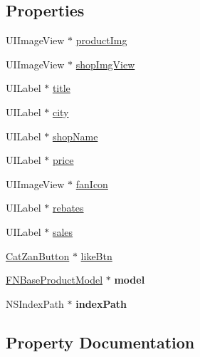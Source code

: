 \subsection*{Properties}
\begin{DoxyCompactItemize}
\item 
U\+I\+Image\+View $\ast$ \mbox{\hyperlink{interface_product_cell_a189ef7a37052dfa1d20b7de5b3c1ef3e}{product\+Img}}
\item 
U\+I\+Image\+View $\ast$ \mbox{\hyperlink{interface_product_cell_a7242ca0f947c47837d8576cdc01fce24}{shop\+Img\+View}}
\item 
U\+I\+Label $\ast$ \mbox{\hyperlink{interface_product_cell_aaff5a1ff89e3c40caf0c2fc336a2fa9a}{title}}
\item 
U\+I\+Label $\ast$ \mbox{\hyperlink{interface_product_cell_a9821fb46904dec3777bd69d106338c48}{city}}
\item 
U\+I\+Label $\ast$ \mbox{\hyperlink{interface_product_cell_a829f21fdd1d59758ae2285c13f5f0f9c}{shop\+Name}}
\item 
U\+I\+Label $\ast$ \mbox{\hyperlink{interface_product_cell_a97f1175a3746c46038e591acc01e43cf}{price}}
\item 
U\+I\+Image\+View $\ast$ \mbox{\hyperlink{interface_product_cell_af03ee8d55febe043dfe8c19d6e80cf51}{fan\+Icon}}
\item 
U\+I\+Label $\ast$ \mbox{\hyperlink{interface_product_cell_a88cc693f9131621461e1aeb4ba9d1b25}{rebates}}
\item 
U\+I\+Label $\ast$ \mbox{\hyperlink{interface_product_cell_a289fadb292e36fa6ea97ec4887435be9}{sales}}
\item 
\mbox{\hyperlink{interface_cat_zan_button}{Cat\+Zan\+Button}} $\ast$ \mbox{\hyperlink{interface_product_cell_a4a15ac98da9d5a229114a546fd2347da}{like\+Btn}}
\item 
\mbox{\label{interface_product_cell_a6767ffd3bf86f807fc0d3a2888d75331}} 
\mbox{\hyperlink{interface_f_n_base_product_model}{F\+N\+Base\+Product\+Model}} $\ast$ {\bfseries model}
\item 
\mbox{\label{interface_product_cell_a26a8bef958d007965d4e6b9973d4a31c}} 
N\+S\+Index\+Path $\ast$ {\bfseries index\+Path}
\end{DoxyCompactItemize}


\subsection{Property Documentation}
\mbox{\label{interface_product_cell_a9821fb46904dec3777bd69d106338c48}} 
